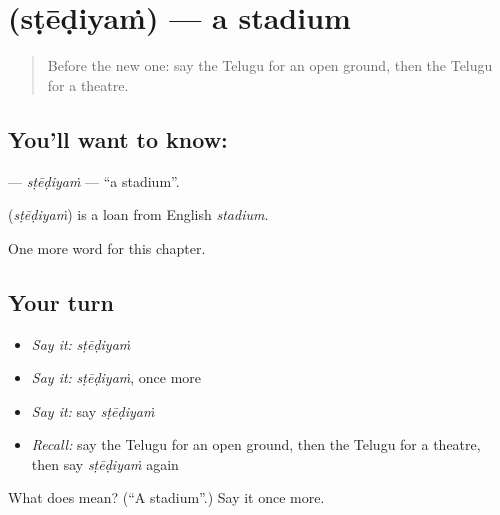 \section[\texorpdfstring{\te{స్టేడియం} (sṭēḍiyaṁ)}{స్టేడియం (sṭēḍiyaṁ)}]{ (sṭēḍiyaṁ) — a stadium}

\label{lesson:TE-C215-stediyam}



\begin{quote}
Before the new one: say the Telugu for an open ground, then the Telugu for a theatre.
\end{quote}

\subsection*{You'll want to know: }
\textbf{} — \emph{sṭēḍiyaṁ} — \textquotedblleft{}a stadium\textquotedblright{}.

\begin{cousinweb}
\textbf{} (\emph{sṭēḍiyaṁ}) is a loan from English \emph{stadium}.
\end{cousinweb}

\begin{grammarlens}[title={What you've built}]
One more word for this chapter.
\end{grammarlens}

\subsection*{Your turn}
\begin{itemize}
\raggedright
  \item \emph{Say it:} \emph{sṭēḍiyaṁ}
  \item \emph{Say it:} \emph{sṭēḍiyaṁ}, once more
  \item \emph{Say it:} say \emph{sṭēḍiyaṁ}
  \item \emph{Recall:} say the Telugu for an open ground, then the Telugu for a theatre, then say \emph{sṭēḍiyaṁ} again
\end{itemize}

\begin{tcolorbox}[breakable,colback=teal!4,colframe=teal!35!black,title={Before you move on}]
What does  mean? (\textquotedblleft{}A stadium\textquotedblright{}.) Say it once more.
\end{tcolorbox}
